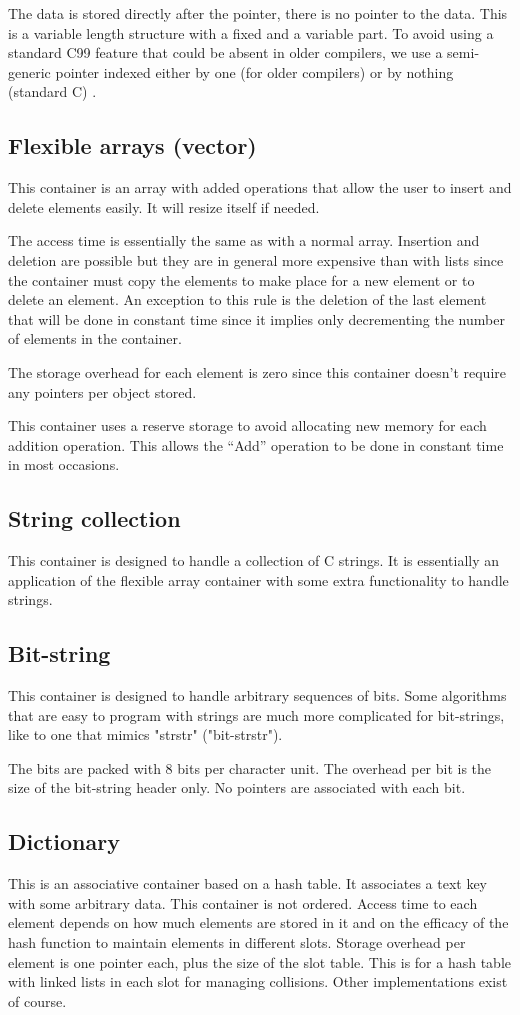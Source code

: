 \documentclass[12pt,a4paper]{memoir} %
\begin{document}
The data is stored directly after the pointer, there is no pointer to the data. This is a variable length structure with a fixed and a variable part. 
To avoid using a standard C99 feature that could be absent in older compilers, we use a semi-generic pointer indexed either by one (for older compilers) or by nothing (standard C) .

\subsection{Flexible arrays (vector)}
This container is an array with added operations that allow the user to insert and delete elements easily. It will resize itself if needed.

The access time is essentially the same as with a normal array. Insertion and deletion are possible but they are in general more expensive than with lists since the container must copy the elements to make place for a new element or to delete an element. An exception to this rule is the deletion of the last element that will be done in constant time since it implies only decrementing the number of elements in the container.

The storage overhead for each element is zero since this container doesn't require any pointers per object stored.

This container uses a reserve storage to avoid allocating new memory for each addition operation. This allows the “Add” operation to be done in constant time in most occasions.
\subsection{String collection}
This container is designed to handle a collection of C strings. It is essentially an application of the flexible array container with some extra functionality to handle strings.
\subsection{Bit-string}
This container is designed to handle arbitrary sequences of bits. Some algorithms that are easy to program with strings are much more complicated for bit-strings, like to one that mimics "strstr" ("bit-strstr"). 

The bits are packed with 8 bits per character unit. The overhead per bit is the size of the bit-string header only. No pointers are associated with each bit.

\subsection{Dictionary}
This is an associative container based on a hash table. It associates a text key with some arbitrary data. This container is not ordered. Access time to each element depends on how much elements are stored in it and on the efficacy of the hash function to maintain elements in different slots. Storage overhead per element is one pointer each, plus the size of the slot table. This is for a hash table with linked lists in each slot for managing collisions. Other implementations exist of course.
\end{document}
